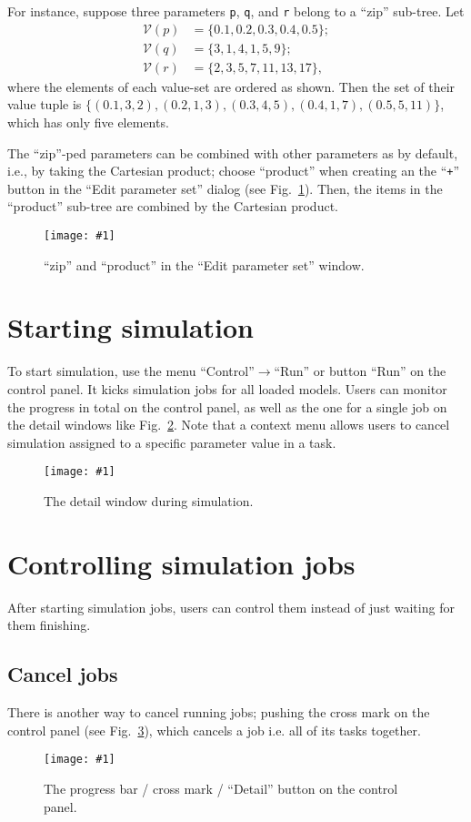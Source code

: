 \documentclass[a4paper,10pt]{report}
\newcommand\FigureOfImage[2]{\begin{figure}[h]
  \centering
  \texttt{[image: \#1]}
  \caption{#2}\label{fig:#1}
\end{figure}}
\begin{document}
For instance, suppose three parameters \verb|p|, \verb|q|, and \verb|r| belong
to a ``zip'' sub-tree. Let
\begin{align}
\mathcal{V}(p) &= \{0.1, 0.2, 0.3, 0.4, 0.5\};\nonumber\\
\mathcal{V}(q) &= \{3, 1, 4, 1, 5, 9\};\nonumber\\
\mathcal{V}(r) &= \{2, 3, 5, 7, 11, 13, 17\},\nonumber
\end{align}
where the elements of each value-set are ordered as shown.
Then the set of their value tuple is $\{(0.1, 3, 2), (0.2, 1, 3), (0.3, 4, 5),
(0.4, 1, 7), (0.5, 5, 11)\}$, which has only five elements.

The ``zip''-ped parameters can be combined with other parameters as by default,
i.e., by taking the Cartesian product; choose ``product'' when creating an
the ``\verb|+|'' button in the ``Edit parameter set'' dialog
(see Fig.~\ref{fig:lr-edit-parameter-set-productzip}).
Then, the items in the ``product'' sub-tree are combined by the Cartesian
product.
\FigureOfImage{lr-edit-parameter-set-productzip}{``zip'' and ``product'' in the ``Edit parameter set'' window.}

\section{Starting simulation}
To start simulation, use the menu ``Control''$\rightarrow$``Run'' or button
``Run'' on the control panel. It kicks simulation jobs for all loaded models.
Users can monitor the progress in total on the control panel, as well as the
one for a single job on the detail windows like Fig.~\ref{fig:lr-detail}.
Note that a context menu allows users to cancel simulation assigned to a
specific parameter value in a task.
\FigureOfImage{lr-detail}{The detail window during simulation.}

\section{Controlling simulation jobs}
After starting simulation jobs, users can control them instead of just waiting
for them finishing.

\subsection{Cancel jobs}
There is another way to cancel running jobs; pushing the cross mark on the
control panel (see Fig.~\ref{fig:lr-progress}), which cancels a job i.e. all
of its tasks together.
\FigureOfImage{lr-progress}{The progress bar / cross mark / ``Detail'' button on
 the control panel.}
\end{document}
